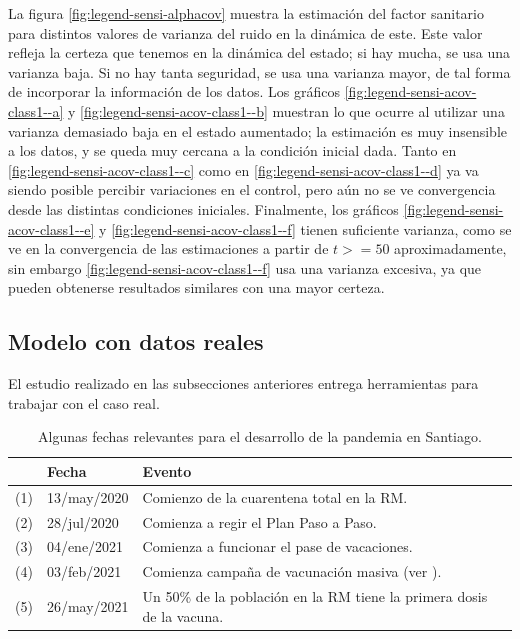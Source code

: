 La figura \ref{fig:legend-sensi-alphacov} muestra la estimación del factor sanitario para distintos valores de varianza del ruido en la dinámica de este. Este valor refleja la certeza que tenemos en la dinámica del estado; si hay mucha, se usa una varianza baja. Si no hay tanta seguridad, se usa una varianza mayor, de tal forma de incorporar la información de los datos. Los gráficos  \ref{fig:legend-sensi-acov-class1--a} y \ref{fig:legend-sensi-acov-class1--b}  muestran lo que ocurre al utilizar una varianza demasiado baja en el estado aumentado; la estimación es muy insensible a los datos, y se queda muy cercana a la condición inicial dada. Tanto en \ref{fig:legend-sensi-acov-class1--c} como en \ref{fig:legend-sensi-acov-class1--d} ya va siendo posible percibir variaciones en el control, pero aún no se ve convergencia desde las distintas condiciones iniciales. Finalmente, los gráficos  \ref{fig:legend-sensi-acov-class1--e} y \ref{fig:legend-sensi-acov-class1--f} tienen suficiente varianza, como se ve en la convergencia de las estimaciones a partir de \(t >=50\) aproximadamente, sin embargo \ref{fig:legend-sensi-acov-class1--f} usa una varianza excesiva, ya que pueden obtenerse resultados similares con una mayor certeza.




\subsection{Modelo con datos reales}\label{subsec:datosreales}

El estudio realizado en las subsecciones anteriores entrega herramientas para trabajar con el caso real.



\begin{table}[h!]
\centering
\begin{tabular}{|| m{1cm} m{3cm} m{8cm}||} 
 \hline
 & \textbf{Fecha} & \textbf{Evento} \\
 \hline 
 (1) & 13/may/2020 & Comienzo de la cuarentena total en la RM.\\
 (2) & 28/jul/2020 & Comienza a regir el Plan Paso a Paso.\\
 (3) & 04/ene/2021 & Comienza a funcionar el pase de vacaciones.\\ 
 (4) & 03/feb/2021 & Comienza campaña de vacunación masiva (ver \cite{MINSAL2021}).\\
 (5) & 26/may/2021 &  Un 50\% de la población en la RM tiene la primera dosis de la vacuna. \\
 \hline
\end{tabular}
\caption{Algunas fechas relevantes para el desarrollo de la pandemia en Santiago.}
\label{table:fechas-relevantes}
\end{table}



